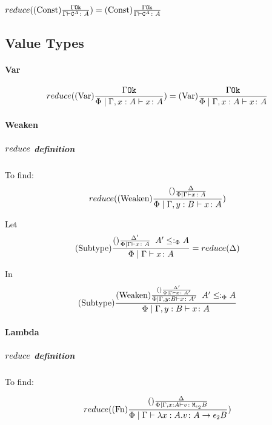 \documentclass{report}
\begin{document}
        $reduce((\text{Const}) \frac{\Gamma \texttt{Ok}}{\Gamma \vdash \texttt{C}^{A} \colon A}) = (\text{Const}) \frac{\Gamma \texttt{Ok}}{\Gamma \vdash \texttt{C}^{A} \colon A}$

    \subsection{Value Types}
        \paragraph{Var}
        \begin{equation}
            reduce((\text{Var}) \frac{\Gamma \texttt{Ok}}{\Phi\mid\Gamma, x: A \vdash x \colon A}) =  (\text{Var}) \frac{\Gamma \texttt{Ok}}{\Phi\mid\Gamma, x: A \vdash x \colon A}
        \end{equation}

        \paragraph{Weaken}
        \subparagraph{$reduce$ definition}
        To find:
        \begin{equation}
            reduce((\text{Weaken}) \frac{(\text{}) \frac{\Delta}{\Phi\mid\Gamma \vdash x \colon A}}{\Phi\mid\Gamma, y: B \vdash x \colon A})
        \end{equation}

        Let 
        \begin{equation}\label{WeakenDeltaReduction}
            (\text{Subtype}) \frac{(\text{}) \frac{\Delta'}{\Phi\mid\Gamma \vdash x \colon A}\;\; A'\leq:_\Phi A}{\Phi\mid\Gamma \vdash x \colon A} = reduce(\Delta)
        \end{equation}

        In 
        \begin{equation}
            (\text{Subtype}) \frac{
            (\text{Weaken}) \frac{
                (\text{}) \frac{\Delta'}{\Phi\mid\Gamma \vdash x \colon A'}
            }{
                \Phi\mid\Gamma, y: B \vdash x \colon A'
            }
            \;\;
            A' \leq:_\Phi A
            }{\Phi\mid\Gamma, y: B \vdash x \colon A}
        \end{equation}

        \paragraph{Lambda}
        \subparagraph{$reduce$ definition}
            To find:
        
            \begin{equation}
                reduce((\text{Fn}) \frac{
                    (\text{}) \frac{\Delta}{\Phi\mid\Gamma, x: A \vdash v \colon \texttt{M}_{\epsilon_2}{B}}
                }{\Phi\mid\Gamma \vdash \lambda x : A. v \colon A\rightarrow \epsilon_2{B}})
            \end{equation}
\end{document}
